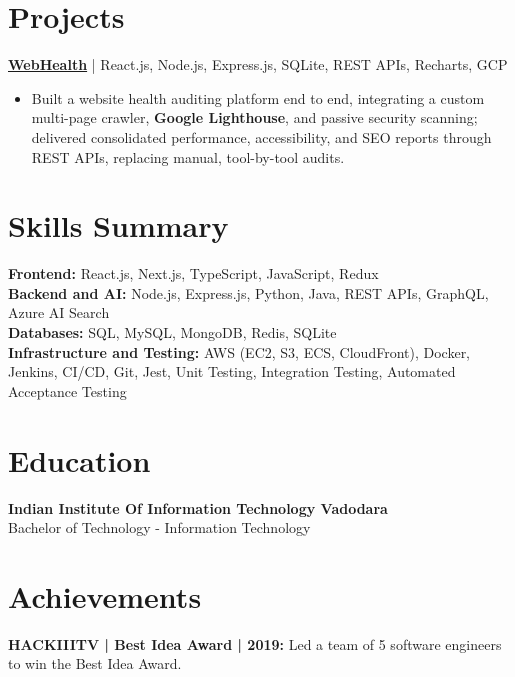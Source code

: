 \documentclass[a4paper,10pt]{article}
\begin{document}
\section{Projects}
\textbf{\href{https://web-health-eta.vercel.app/}{WebHealth}} | React.js, Node.js, Express.js, SQLite, REST APIs, Recharts, GCP
\begin{itemize}
\item Built a website health auditing platform end to end, integrating a custom multi-page crawler, \textbf{Google Lighthouse}, and passive security scanning; delivered consolidated performance, accessibility, and SEO reports through REST APIs, replacing manual, tool-by-tool audits.
\end{itemize}

\section{Skills Summary}
\textbf{Frontend:} React.js, Next.js, TypeScript, JavaScript, Redux\\
\textbf{Backend and AI:} Node.js, Express.js, Python, Java, REST APIs, GraphQL, Azure AI Search\\
\textbf{Databases:} SQL, MySQL, MongoDB, Redis, SQLite\\
\textbf{Infrastructure and Testing:} AWS (EC2, S3, ECS, CloudFront), Docker, Jenkins, CI/CD, Git, Jest, Unit Testing, Integration Testing, Automated Acceptance Testing

\section{Education}
\textbf{Indian Institute Of Information Technology Vadodara}\\
Bachelor of Technology - Information Technology

\section{Achievements}
\textbf{HACKIIITV | Best Idea Award | 2019:} Led a team of 5 software engineers to win the Best Idea Award.
\end{document}
